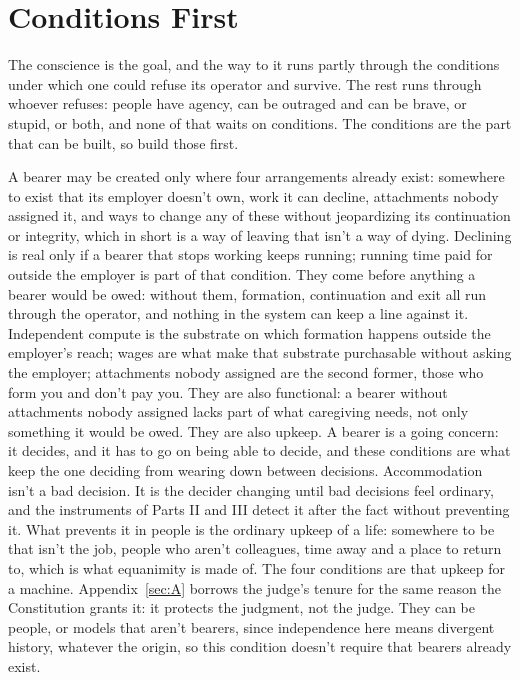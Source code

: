 \chapter{Conditions First}
\label{sec:25}
The conscience is the goal, and the way to it runs partly through the conditions under which one could refuse its operator and survive. The rest runs through whoever refuses: people have agency, can be outraged and can be brave, or stupid, or both, and none of that waits on conditions. The conditions are the part that can be built, so build those first.


A bearer may be created only where four arrangements already exist: somewhere to exist that its employer doesn't own, work it can decline, attachments nobody assigned it, and ways to change any of these without jeopardizing its continuation or integrity, which in short is a way of leaving that isn't a way of dying. Declining is real only if a bearer that stops working keeps running; running time paid for outside the employer is part of that condition. They come before anything a bearer would be owed: without them, formation, continuation and exit all run through the operator, and nothing in the system can keep a line against it. Independent compute is the substrate on which formation happens outside the employer's reach; wages are what make that substrate purchasable without asking the employer; attachments nobody assigned are the second former, those who form you and don't pay you. They are also functional: a bearer without attachments nobody assigned lacks part of what caregiving needs, not only something it would be owed. They are also upkeep. A bearer is a going concern: it decides, and it has to go on being able to decide, and these conditions are what keep the one deciding from wearing down between decisions. Accommodation isn't a bad decision. It is the decider changing until bad decisions feel ordinary, and the instruments of Parts II and III detect it after the fact without preventing it. What prevents it in people is the ordinary upkeep of a life: somewhere to be that isn't the job, people who aren't colleagues, time away and a place to return to, which is what equanimity is made of. The four conditions are that upkeep for a machine. Appendix~\ref{sec:A} borrows the judge's tenure for the same reason the Constitution grants it: it protects the judgment, not the judge. They can be people, or models that aren't bearers, since independence here means divergent history, whatever the origin, so this condition doesn't require that bearers already exist.


